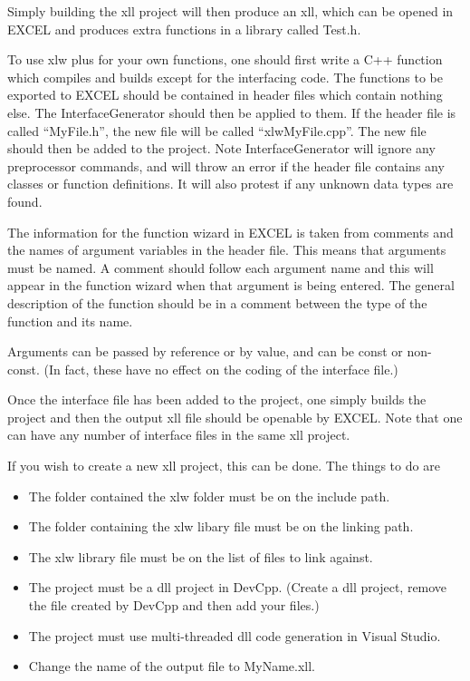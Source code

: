 \documentclass[12pt,reqno]{amsart}
\numberwithin{equation}{section}
\numberwithin{figure}{section}
\begin{document}
Simply building the xll project will then produce an xll, which can be
opened in EXCEL and produces extra functions in a library called
Test.h. 

To use xlw plus for your own functions, one should first write a C++
function which compiles 
and builds except for the interfacing code. The functions to be
exported to EXCEL should be contained in header files which contain
nothing else. The InterfaceGenerator should then be applied to
them. If the header file is called ``MyFile.h'', the new file will be
called ``xlwMyFile.cpp''. The new file should then be added to the
project. Note InterfaceGenerator will ignore any preprocessor
commands, and will throw an error if the header file contains any
classes or function definitions. It will also protest if any unknown
data types are found. 

The information for the function wizard in EXCEL is taken from
comments and the names of argument variables in the header file. This
means that arguments must be named. A comment should follow each
argument name and this will appear in the function wizard when that
argument is being entered. The general description of the function
should be in a comment between the type of the function and its name. 

Arguments can be passed by reference or by value, and can be const or
non-const. (In fact, these have no effect on the coding of the
interface file.)

Once  the interface file has been added to the project, one simply
builds the project
and then the output xll file should be openable by EXCEL. Note that
one can
have any number of interface files in the same xll project. 

If you wish to create a new xll project, this can be done. The things
to do are 
\begin{itemize}
\item The folder contained the xlw folder must be on the include path.
\item The folder containing the xlw libary file must be on the linking
  path.
\item The xlw library file must be on the list of files to link
  against. 
\item The project must be a dll project in DevCpp. (Create a dll
  project, remove the file created by DevCpp and then add your files.) 
\item The project must use multi-threaded dll code generation in
  Visual Studio. 
\item Change the name of the output file to MyName.xll. 
\end{itemize}
\end{document}
